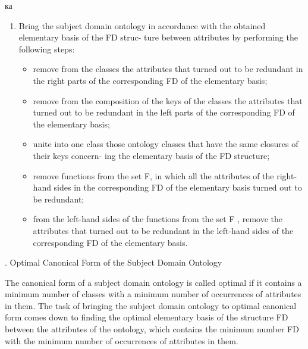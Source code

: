 ка\documentclass[times]{article}
\newcommand{\RomanNumeralCaps}[1]
    {\MakeUppercase{\romannumeral #1}}
\begin{document}
\begin{enumerate}[1{)}]
    \item Bring the subject domain ontology in accordance with the obtained elementary basis of the FD struc- ture between attributes by performing the following steps:
    \begin{itemize}
        \setlength{\itemsep}{1pt}
        \setlength{\parskip}{0pt}
        \item remove from the classes the attributes that turned out to be redundant in the right parts of the corresponding FD of the elementary basis;
        \item remove from the composition of the keys of the classes the attributes that turned out to be redundant in the left parts of the corresponding FD of the elementary basis;
        \item unite into one class those ontology classes that have the same closures of their keys concern- ing the elementary basis of the FD structure;
        \item remove functions from the set F, in which all the attributes of the right-hand sides in the corresponding FD of the elementary basis turned out to be redundant;
        \item from the left-hand sides of the functions from the set F , remove the attributes that turned out to be redundant in the left-hand sides of the corresponding FD of the elementary basis.
    \end{itemize}
\end{enumerate}
\begin{center}
{ \RomanNumeralCaps{5}. Optimal Canonical Form of the Subject Domain Ontology}
\end{center}

The canonical form of a subject domain ontology is called optimal if it contains a minimum number of classes with a minimum number of occurrences of attributes in them. The task of bringing the subject domain ontology to optimal canonical form comes down to finding the optimal elementary basis of the structure FD between the attributes of the ontology, which contains the minimum number FD with the minimum number of occurrences of attributes in them.
\end{document}
